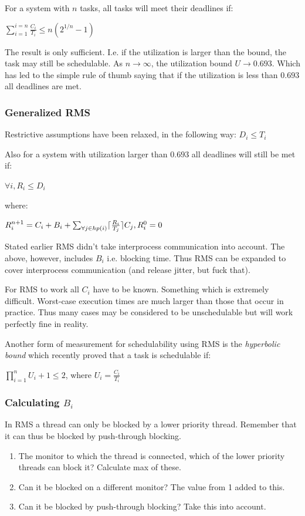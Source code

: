 \documentclass[a4paper]{article}
\DeclarePairedDelimiter{\ceil}{\lceil}{\rceil}
\begin{document}
For a system with $n$ tasks, all tasks will meet their deadlines if:

\begin{center}
  $ \sum_{i=1}^{i=n} \frac{C_i}{T_i} \leq n(2^{1/n} - 1) $
\end{center}

The result is only sufficient. I.e. if the utilization is larger than the bound,
the task may still be schedulable. As $n \rightarrow \infty$, the utilization
bound $U \rightarrow 0.693$. Which has led to the simple rule of thumb saying
that if the utilization is less than $0.693$ all deadlines are met.

\subsubsection{Generalized RMS}
Restrictive assumptions have been relaxed, in the following way: $D_i \leq T_i$

Also for a system with utilization larger than $0.693$ all deadlines will still
be met if:

\begin{center}
  $\forall i, R_i \leq D_i$
\end{center}
where:
\begin{center}
  $R_i^{n+1} = C_i + B_i + \sum_{\forall j \in hp(i)} \ceil{\frac{R_i}{T_j}} C_j, R_i^0 = 0$
\end{center}

Stated earlier RMS didn't take interprocess communication into account. The above,
however, includes $B_i$ i.e. blocking time. Thus RMS can be expanded to cover
interprocess communication (and release jitter, but fuck that).

For RMS to work all $C_i$ have to be known. Something which is extremely difficult.
Worst-case execution times are much larger than those that occur in practice.
Thus many cases may be considered to be unschedulable but will work perfectly fine
in reality.

Another form of measurement for schedulability using RMS is the \emph{hyperbolic bound}
which recently proved that a task is schedulable if:

\begin{center}
  $\prod_{i=1}^{n} U_i + 1 \leq 2$, where $U_i = \frac{C_i}{T_i}$
\end{center}


\subsubsection{Calculating $B_i$}
In RMS a thread can only be blocked by a lower priority thread. Remember that
it can thus be blocked by push-through blocking.

\begin{enumerate}
  \item The monitor to which the thread is connected, which of the lower
        priority threads can block it? Calculate max of these.
  \item Can it be blocked on a different monitor? The value from 1 added to this.
  \item Can it be blocked by push-through blocking? Take this into account.
\end{enumerate}
\end{document}
